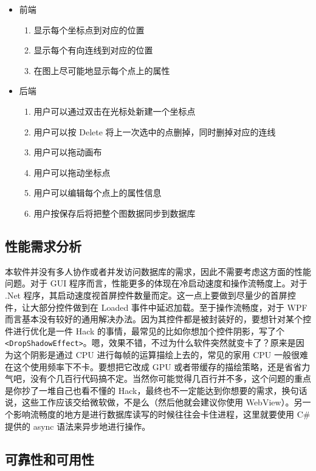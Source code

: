 \begin{itemize}
  \item 前端
  \begin{enumerate}
    \item 显示每个坐标点到对应的位置
    \item 显示每个有向连线到对应的位置
    \item 在图上尽可能地显示每个点上的属性
  \end{enumerate}
  \item 后端
  \begin{enumerate}
    \item 用户可以通过双击在光标处新建一个坐标点
    \item 用户可以按 Delete 将上一次选中的点删掉，同时删掉对应的连线
    \item 用户可以拖动画布
    \item 用户可以拖动坐标点
    \item 用户可以编辑每个点上的属性信息
    \item 用户按保存后将把整个图数据同步到数据库
  \end{enumerate}
\end{itemize}

\subsection{性能需求分析}

本软件并没有多人协作或者并发访问数据库的需求，因此不需要考虑这方面的性能问题。对于 GUI 程序而言，性能更多的体现在冷启动速度和操作流畅度上。对于 .Net 程序，其启动速度视首屏控件数量而定。这一点上要做到尽量少的首屏控件，让大部分控件做到在 Loaded 事件中延迟加载。至于操作流畅度，对于 WPF 而言基本没有较好的通用解决办法。因为其控件都是被封装好的，要想针对某个控件进行优化是一件 Hack 的事情，最常见的比如你想加个控件阴影，写了个 \texttt{<DropShadowEffect>}。嗯，效果不错，不过为什么软件突然就变卡了？原来是因为这个阴影是通过 CPU 进行每帧的运算描绘上去的，常见的家用 CPU 一般很难在这个使用频率下不卡。要想把它改成 GPU 或者带缓存的描绘策略，还是省省力气吧，没有个几百行代码搞不定。当然你可能觉得几百行并不多，这个问题的重点是你抄了一堆自己也看不懂的 Hack，最终也不一定能达到你想要的需求，换句话说，这些工作应该交给微软做，不是么（然后他就会建议你使用 WebView）。另一个影响流畅度的地方是进行数据库读写的时候往往会卡住进程，这里就要使用 C\# 提供的 async 语法来异步地进行操作。

\subsection{可靠性和可用性}

